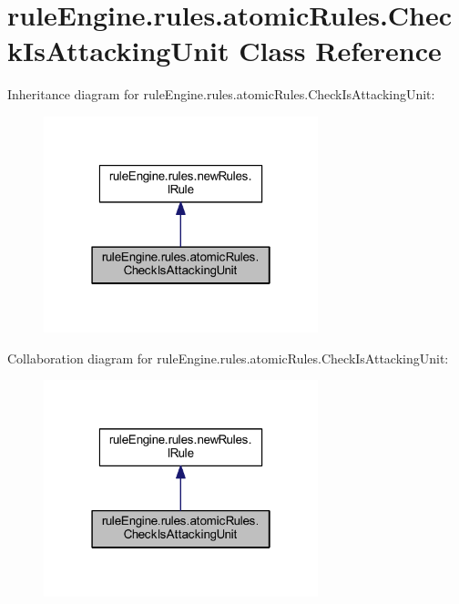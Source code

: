 \hypertarget{classrule_engine_1_1rules_1_1atomic_rules_1_1_check_is_attacking_unit}{}\section{rule\+Engine.\+rules.\+atomic\+Rules.\+Check\+Is\+Attacking\+Unit Class Reference}
\label{classrule_engine_1_1rules_1_1atomic_rules_1_1_check_is_attacking_unit}


Inheritance diagram for rule\+Engine.\+rules.\+atomic\+Rules.\+Check\+Is\+Attacking\+Unit\+:
\nopagebreak
\begin{figure}[H]
\begin{center}
\leavevmode
\includegraphics[width=226pt]{classrule_engine_1_1rules_1_1atomic_rules_1_1_check_is_attacking_unit__inherit__graph}
\end{center}
\end{figure}


Collaboration diagram for rule\+Engine.\+rules.\+atomic\+Rules.\+Check\+Is\+Attacking\+Unit\+:
\nopagebreak
\begin{figure}[H]
\begin{center}
\leavevmode
\includegraphics[width=226pt]{classrule_engine_1_1rules_1_1atomic_rules_1_1_check_is_attacking_unit__coll__graph}
\end{center}
\end{figure}
